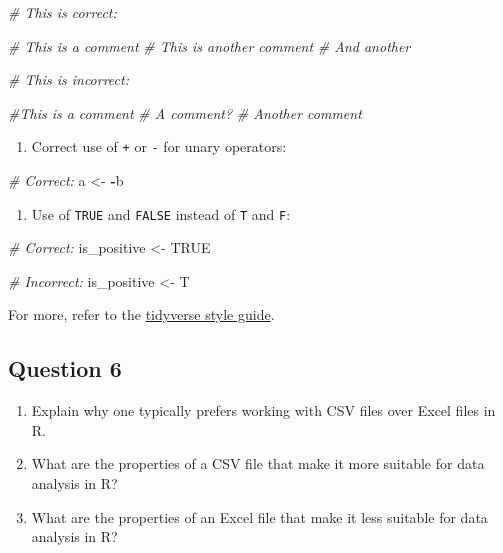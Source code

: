 \documentclass[
  10t,
]{article}
\newenvironment{Shaded}{\begin{snugshade}}{\end{snugshade}}
\newcommand{\CommentTok}[1]{\textcolor[rgb]{0.56,0.35,0.01}{\textit{#1}}}
\newcommand{\ConstantTok}[1]{\textcolor[rgb]{0.56,0.35,0.01}{#1}}
\newcommand{\NormalTok}[1]{#1}
\newcommand{\OtherTok}[1]{\textcolor[rgb]{0.56,0.35,0.01}{#1}}
\newcommand{\SpecialCharTok}[1]{\textcolor[rgb]{0.81,0.36,0.00}{\textbf{#1}}}
\providecommand{\tightlist}{%
  \setlength{\itemsep}{0pt}\setlength{\parskip}{0pt}}
\let\oldtexttt\texttt
\renewcommand{\texttt}[1]{\oldtexttt{\small #1}}
\begin{document}
\begin{Shaded}
\begin{Highlighting}[]
\CommentTok{\# This is correct:}

\CommentTok{\# This is a comment}
\CommentTok{\# This is another comment}
\CommentTok{\# And another}

\CommentTok{\# This is incorrect:}

\CommentTok{\#This is a comment}
\CommentTok{\# A comment?}
\CommentTok{\#  Another comment}
\end{Highlighting}
\end{Shaded}

\begin{enumerate}
\def\labelenumi{\arabic{enumi}.}
\setcounter{enumi}{7}
\tightlist
\item
  Correct use of \texttt{+} or \texttt{-} for unary operators:
\end{enumerate}

\begin{Shaded}
\begin{Highlighting}[]
\CommentTok{\# Correct:}
\NormalTok{a }\OtherTok{\textless{}{-}} \SpecialCharTok{{-}}\NormalTok{b}
\end{Highlighting}
\end{Shaded}

\begin{enumerate}
\def\labelenumi{\arabic{enumi}.}
\setcounter{enumi}{8}
\tightlist
\item
  Use of \texttt{TRUE} and \texttt{FALSE} instead of \texttt{T} and
  \texttt{F}:
\end{enumerate}

\begin{Shaded}
\begin{Highlighting}[]
\CommentTok{\# Correct:}
\NormalTok{is\_positive }\OtherTok{\textless{}{-}} \ConstantTok{TRUE}

\CommentTok{\# Incorrect:}
\NormalTok{is\_positive }\OtherTok{\textless{}{-}}\NormalTok{ T}
\end{Highlighting}
\end{Shaded}

For more, refer to the
\href{https://style.tidyverse.org/syntax.html}{tidyverse style guide}.

\subsection{Question 6}\label{question-6}

\begin{enumerate}
\def\labelenumi{\alph{enumi}.}
\tightlist
\item
  Explain why one typically prefers working with CSV files over Excel
  files in R.
\item
  What are the properties of a CSV file that make it more suitable for
  data analysis in R?
\item
  What are the properties of an Excel file that make it less suitable
  for data analysis in R?
\end{enumerate}
\end{document}
